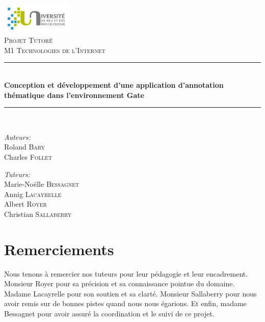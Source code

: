 \documentclass[a4paper, 11pt]{book}
\newcommand{\HRule}{\rule{\linewidth}{0.5mm}}
\begin{document}
\author{Charles Follet \and Roland Bary}

\begin{titlepage}
\begin{center}

\includegraphics[width=0.25\textwidth]{./logo.png}~\\[1cm]

\textsc{\Large Projet Tutoré}\\[0.5cm]
\textsc{\Large M1 Technologies de l'Internet}\\[0.5cm]

\HRule \\[0.4cm]
{ \LARGE \bfseries Conception et développement d’une application d’annotation thématique dans
l'environnement Gate \\[0.4cm] }

\HRule \\[1.5cm]

\noindent
\begin{minipage}[t]{0.4\textwidth}
\begin{flushleft} \large
\emph{Auteurs:}\\
Roland \textsc{Bary}\\
Charles \textsc{Follet}
\end{flushleft}
\end{minipage}%
\begin{minipage}[t]{0.4\textwidth}
\begin{flushright} \large
\emph{Tuteurs:} \\
Marie-Noëlle \textsc{Bessagnet}\\
Annig \textsc{Lacayrelle}\\
Albert \textsc{Royer}\\
Christian \textsc{Sallaberry}
\end{flushright}
\end{minipage}

\vfill

{\large \date{}}

\end{center}
\end{titlepage}
\section*{Remerciements}
Nous tenons à remercier nos tuteurs pour leur pédagogie et leur encadrement. Monsieur Royer pour sa précision et sa connaissance pointue du domaine. Madame Lacayrelle pour son soutien et sa clarté. Monsieur Sallaberry pour nous avoir remis sur de bonnes pistes quand nous nous égarions. Et enfin, madame Bessagnet pour avoir assuré la coordination et le suivi de ce projet.
\tableofcontents
\end{document}

